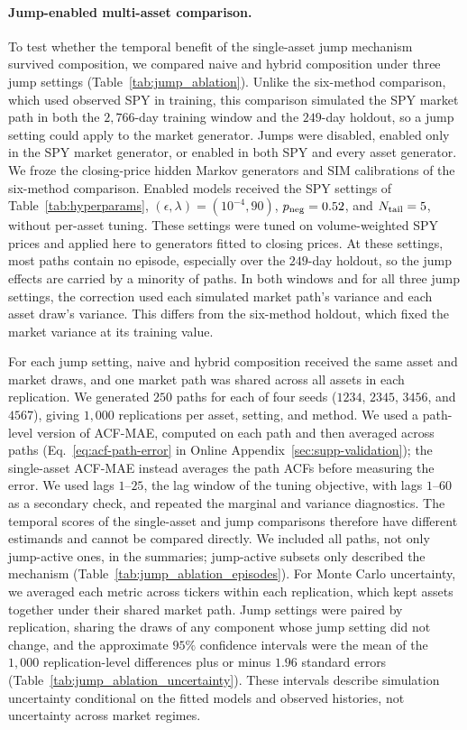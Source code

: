 \paragraph{Jump-enabled multi-asset comparison.}

To test whether the temporal benefit of the single-asset jump
mechanism survived composition, we compared naive and hybrid
composition under three jump settings (Table~\ref{tab:jump_ablation}).
Unlike the six-method comparison, which used observed SPY in
training, this comparison simulated the SPY market path in both the
$2{,}766$-day training window and the $249$-day holdout, so a jump
setting could apply to the market generator. Jumps were disabled,
enabled only in the SPY market generator, or enabled in both SPY and
every asset generator. We froze the closing-price hidden Markov generators and SIM
calibrations of the six-method comparison. Enabled models
received the SPY settings of Table~\ref{tab:hyperparams},
$(\epsilon,\lambda)=(10^{-4},90)$, $p_{\rm neg}=0.52$, and
$N_{\rm tail}=5$, without per-asset tuning. These settings were tuned on volume-weighted SPY prices and applied
here to generators fitted to closing prices. At these settings,
most paths contain no episode, especially over the $249$-day holdout,
so the jump effects are carried by a minority of paths. In both windows and for all three jump settings, the correction used
each simulated market path's variance and each asset draw's variance.
This differs from the six-method holdout, which fixed the market
variance at its training value.

For each jump setting, naive and hybrid composition received the same
asset and market draws, and one market path was
shared across all assets in each replication. We generated $250$
paths for each of four seeds ($1234$, $2345$, $3456$, and $4567$),
giving $1{,}000$ replications per asset, setting, and method. We used a path-level version of ACF-MAE, computed on each path and
then averaged across paths (Eq.~\eqref{eq:acf-path-error} in Online
Appendix~\ref{sec:supp-validation}); the single-asset ACF-MAE instead
averages the path ACFs before measuring the error. We used
lags $1$--$25$, the lag window of the tuning objective, with lags
$1$--$60$ as a secondary check, and repeated the marginal and variance
diagnostics. The temporal scores of the single-asset and jump comparisons
therefore have different estimands and cannot be compared directly. We included all paths, not only jump-active ones, in the summaries;
jump-active subsets only described the mechanism
(Table~\ref{tab:jump_ablation_episodes}). For Monte Carlo uncertainty, we averaged each metric across tickers
within each replication, which kept assets together under their
shared market path. Jump settings were paired by replication, sharing
the draws of any component whose jump setting did not change, and the
approximate $95\%$ confidence intervals were the mean of the $1{,}000$
replication-level differences plus or minus $1.96$ standard errors
(Table~\ref{tab:jump_ablation_uncertainty}). These intervals describe simulation
uncertainty conditional on the fitted models and observed histories,
not uncertainty across market regimes.
